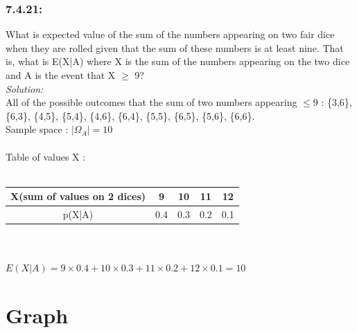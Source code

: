 \documentclass[a4paper]{article}
\begin{document}
	
	\subsubsection*{7.4.21:}
     What is expected value of the sum of the numbers appearing on two fair dice when they are rolled given that the sum of these numbers is at least nine. That is, what is E(X|A) where X is the sum of the numbers appearing on the two dice and A is the event that X $\geq$ 9? \\  
	\textit{Solution:}\\
	All of the possible outcomes that the sum of two numbers appearing $\leq 9$ : \{3,6\}, \{6,3\}, \{4,5\}, \{5,4\}, \{4,6\}, \{6,4\}, \{5,5\}, \{6,5\}, \{5,6\}, \{6,6\}.\\
	Sample space : $|\Omega_A| = 10$ \\ \\
	Table of values X : \\ \\
	\begin{tabular}{|c|c|c|c|c|}
		\hline
		X(sum of values on 2 dices)& 9 & 10 & 11 & 12 \\
		\hline
		p(X|A)& 0.4 & 0.3 & 0.2 & 0.1 \\
		\hline
	\end{tabular}
	\\ \\
	$E(X|A) = 9\times0.4 + 10\times0.3 + 11\times0.2 + 12\times 0.1 = 10$                                 \\ 
	
	\newpage
	\section*{Graph}
\end{document}
